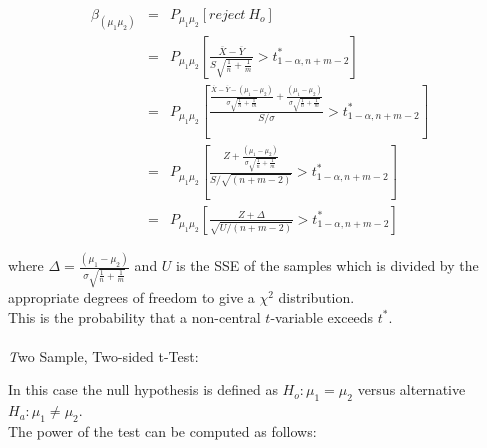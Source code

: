 \documentclass[12pt,a4paper]{article}
\theoremstyle{regla}
\theoremstyle{remark}
\theoremstyle{definition}
\theoremstyle{nonumberbreak}
\begin{document}
\begin{eqnarray*}
\beta_{(\mu_1\mu_2)}& = & P_{\mu_1\mu_2}\left[reject~H_o \right]\\
& = & P_{\mu_1\mu_2}\left[\frac{\overline{X}-\overline{Y}}{S\sqrt{\frac{1}{n}+\frac{1}{m}}} > t^\ast_{1-\alpha,n+m-2} \right]\\
& = &  P_{\mu_1\mu_2}\left[\frac{\frac{\overline{X}-\overline{Y}-(\mu_1-\mu_2)}{\sigma\sqrt{\frac{1}{n}+\frac{1}{m}}}+ \frac{(\mu_1-\mu_2)}{\sigma\sqrt{\frac{1}{n}+\frac{1}{m}}}}{S/\sigma} > t^\ast_{1-\alpha,n+m-2}\right]\\
& = &  P_{\mu_1\mu_2}\left[\frac{Z +\frac{(\mu_1-\mu_2)}{\sigma\sqrt{\frac{1}{n}+\frac{1}{m}}}}
{S/\sqrt{(n+m-2)}} > t^\ast_{1-\alpha,n+m-2} \right]\\
& = &  P_{\mu_1\mu_2}\left[ \frac{Z + \Delta}{\sqrt{U/(n+m-2)}} > t^\ast_{1-\alpha,n+m-2} \right]
\end{eqnarray*}

where $\Delta = \frac{(\mu_1-\mu_2)}{\sigma\sqrt{\frac{1}{n}+\frac{1}{m}}} $ and 
$U$ is the SSE of the samples which is divided by the appropriate degrees of freedom to give a $\chi^2$ distribution.\\

This is the probability that a non-central $t$-variable exceeds $t^\ast$.\\\\

{\emph Two Sample, Two-sided t-Test}:

In this case the null hypothesis is defined as $H_o: \mu_1 = \mu_2$ versus alternative $H_a: \mu_1 \neq \mu_2$. \\

The power of the test can be computed as follows:\\
\end{document}
